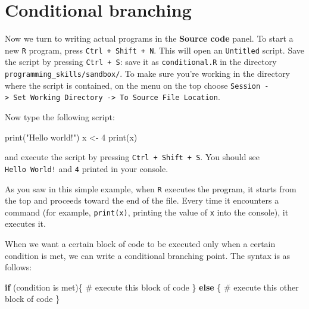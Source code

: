 \documentclass[
  letterpaper,
  DIV=11,
  numbers=noendperiod]{scrreprt}
\newenvironment{Shaded}{\begin{snugshade}}{\end{snugshade}}
\newcommand{\CommentTok}[1]{\textcolor[rgb]{0.37,0.37,0.37}{#1}}
\newcommand{\ControlFlowTok}[1]{\textcolor[rgb]{0.00,0.23,0.31}{\textbf{#1}}}
\newcommand{\DecValTok}[1]{\textcolor[rgb]{0.68,0.00,0.00}{#1}}
\newcommand{\FunctionTok}[1]{\textcolor[rgb]{0.28,0.35,0.67}{#1}}
\newcommand{\NormalTok}[1]{\textcolor[rgb]{0.00,0.23,0.31}{#1}}
\newcommand{\OtherTok}[1]{\textcolor[rgb]{0.00,0.23,0.31}{#1}}
\newcommand{\StringTok}[1]{\textcolor[rgb]{0.13,0.47,0.30}{#1}}
\begin{document}
\section*{Conditional branching}\label{conditional-branching}


Now we turn to writing actual programs in the \textbf{Source code}
panel. To start a new \texttt{R} program, press
\texttt{Ctrl\ +\ Shift\ +\ N}. This will open an \texttt{Untitled}
script. Save the script by pressing \texttt{Ctrl\ +\ S}: save it as
\texttt{conditional.R} in the directory
\texttt{programming\_skills/sandbox/}. To make sure you're working in
the directory where the script is contained, on the menu on the top
choose
\texttt{Session\ -\textgreater{}\ Set\ Working\ Directory\ -\textgreater{}\ To\ Source\ File\ Location}.

Now type the following script:

\begin{Shaded}
\begin{Highlighting}[]
\FunctionTok{print}\NormalTok{(}\StringTok{"Hello world!"}\NormalTok{)}
\NormalTok{x }\OtherTok{\textless{}{-}} \DecValTok{4}
\FunctionTok{print}\NormalTok{(x)}
\end{Highlighting}
\end{Shaded}

and execute the script by pressing \texttt{Ctrl\ +\ Shift\ +\ S}. You
should see \texttt{Hello\ World!} and \texttt{4} printed in your
console.

As you saw in this simple example, when \texttt{R} executes the program,
it starts from the top and proceeds toward the end of the file. Every
time it encounters a command (for example, \texttt{print(x)}, printing
the value of \texttt{x} into the console), it executes it.

When we want a certain block of code to be executed only when a certain
condition is met, we can write a conditional branching point. The syntax
is as follows:

\begin{Shaded}
\begin{Highlighting}[]
\ControlFlowTok{if}\NormalTok{ (condition is met)\{}
  \CommentTok{\# execute this block of code}
\NormalTok{\} }\ControlFlowTok{else}\NormalTok{ \{}
  \CommentTok{\# execute this other block of code}
\NormalTok{\}}
\end{Highlighting}
\end{Shaded}
\end{document}

